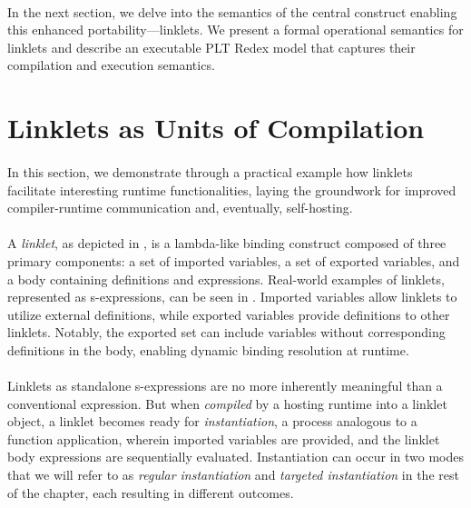 		\paragraph{}%
			In the next section, we delve into the semantics of the central construct enabling this enhanced portability—linklets. We present a formal operational semantics for linklets and describe an executable PLT Redex model that captures their compilation and execution semantics.

	\section[\texorpdfstring{Linklets as Units of Compilation}{Example Use: REPL}]{Linklets as Units of Compilation}
		\label{section:linklet-semantics}

		\paragraph{}%
			In this section, we demonstrate through a practical example how linklets facilitate interesting runtime functionalities, laying the groundwork for improved compiler-runtime communication and, eventually, self-hosting.


		\paragraph{}%
			A \emph{linklet}, as depicted in , is a lambda-like binding construct composed of three primary components: a set of imported variables, a set of exported variables, and a body containing definitions and expressions. Real-world examples of linklets, represented as s-expressions, can be seen in . Imported variables allow linklets to utilize external definitions, while exported variables provide definitions to other linklets. Notably, the exported set can include variables without corresponding definitions in the body, enabling dynamic binding resolution at runtime.

		\paragraph{}%
			Linklets as standalone s-expressions are no more inherently meaningful than a conventional  expression. But when \emph{compiled} by a hosting runtime into a linklet object, a linklet becomes ready for \emph{instantiation}, a process analogous to a function application, wherein imported variables are provided, and the linklet body expressions are sequentially evaluated. Instantiation can occur in two modes that we will refer to as \emph{regular instantiation} and \emph{targeted instantiation} in the rest of the chapter, each resulting in different outcomes.

